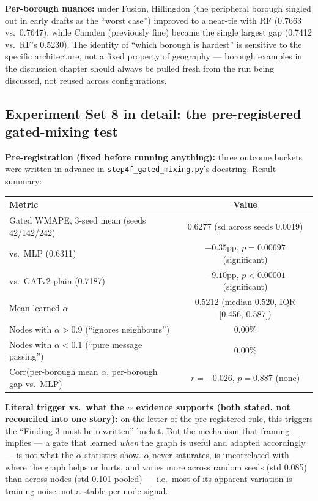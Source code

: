 \documentclass[11pt]{article}
\let\oldsubsection\subsection
\renewcommand{\subsection}[1]{\oldsubsection{\color{sectcolor}#1}}
\begin{document}
\textbf{Per-borough nuance:} under Fusion, Hillingdon (the peripheral borough singled out in
early drafts as the ``worst case'') improved to a near-tie with RF (0.7663 vs.\ 0.7647), while
Camden (previously fine) became the single largest gap (0.7412 vs.\ RF's 0.5230). The
identity of ``which borough is hardest'' is sensitive to the specific architecture, not a
fixed property of geography --- borough examples in the discussion chapter should always be
pulled fresh from the run being discussed, not reused across configurations.

\subsection{Experiment Set 8 in detail: the pre-registered gated-mixing test}
\label{sec:expset8}
\textbf{Pre-registration (fixed before running anything):} three outcome buckets were
written in advance in \texttt{step4f\_gated\_mixing.py}'s docstring. Result summary:

\begin{center}
\small
\begin{tabular}{@{}lc@{}}
\toprule
\textbf{Metric} & \textbf{Value} \\
\midrule
Gated WMAPE, 3-seed mean (seeds 42/142/242) & 0.6277 (sd across seeds 0.0019) \\
vs.\ MLP (0.6311) & $-0.35$pp, $p=0.00697$ (significant) \\
vs.\ GATv2 plain (0.7187) & $-9.10$pp, $p<0.00001$ (significant) \\
Mean learned $\alpha$ & 0.5212 (median 0.520, IQR [0.456, 0.587]) \\
Nodes with $\alpha>0.9$ (``ignores neighbours'') & 0.00\% \\
Nodes with $\alpha<0.1$ (``pure message passing'') & 0.00\% \\
Corr(per-borough mean $\alpha$, per-borough gap vs.\ MLP) & $r=-0.026$, $p=0.887$ (none) \\
\bottomrule
\end{tabular}
\end{center}

\textbf{Literal trigger vs.\ what the $\alpha$ evidence supports (both stated, not
reconciled into one story):} on the letter of the pre-registered rule, this triggers the
``Finding 3 must be rewritten'' bucket. But the mechanism that framing implies --- a gate
that learned \emph{when} the graph is useful and adapted accordingly --- is not what the
$\alpha$ statistics show. $\alpha$ never saturates, is uncorrelated with where the graph
helps or hurts, and varies more across random seeds (std 0.085) than across nodes (std
0.101 pooled) --- i.e.\ most of its apparent variation is training noise, not a stable
per-node signal.
\end{document}
